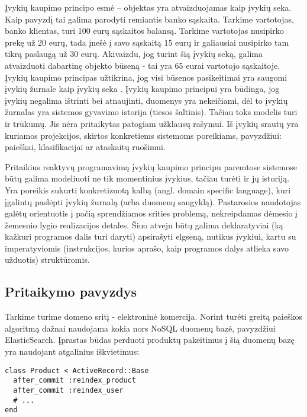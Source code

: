 Įvykių kaupimo principo esmė – objektas yra atvaizduojamas kaip įvykių seka. Kaip pavyzdį tai galima parodyti remiantis banko sąskaita. Tarkime vartotojas, banko klientas, turi 100 eurų sąskaitos balansą. Tarkime vartotojas nusipirko prekę už 20 eurų, tada įnešė į savo sąskaitą 15 eurų ir galiausiai nusipirko tam tikrą paslaugą už 30 eurų. Akivaizdu, jog turint šią įvykių seką, galima atvaizduoti dabartinę objekto būseną - tai yra 65 eurai vartotojo sąskaitoje. Įvykių kaupimo principas užtikrina, jog visi būsenos pasikeitimai yra saugomi įvykių žurnale kaip įvykių seka \cite{vernon2013implementing}. Įvykių kaupimo principui yra būdinga, jog įvykių negalima ištrinti bei atnaujinti, duomenys yra nekeičiami, dėl to įvykių žurnalas yra sistemos gyvavimo istorija (tiesos šaltinis). Tačiau toks modelis turi ir trūkumų. Jis nėra pritaikytas patogiam užklausų rašymui. Iš įvykių srautų yra kuriamos projekcijos, skirtos konkretiems sistemoms poreikiams, pavyzdžiui: paieškai, klasifikacijai ar ataskaitų ruošimui.

Pritaikius reaktyvų programavimą įvykių kaupimo principu paremtose sistemose būtų galima modeliuoti ne tik momentinius įvykius, tačiau turėti ir jų istoriją. Yra poreikis sukurti konkretizuotą kalbą (angl. domain specific language), kuri įgalintų paslėpti įvykių žurnalą (arba duomenų saugyklą). Pastarosios naudotojas galėtų orientuotis į pačią sprendžiamos srities problemą, nekreipdamas dėmesio į žemesnio lygio realizacijos detales. Šiuo atveju būtų galima deklaratyviai (ką kažkuri programos dalis turi daryti) apsirašyti elgseną, nutikus įvykiui, kartu su imperatyviomis (instrukcijos, kurios aprašo, kaip programos dalys atlieka savo užduotis) struktūromis.

\subsection{Pritaikymo pavyzdys}

Tarkime turime domeno sritį - elektroninė komercija. Norint turėti greitą paieškos algoritmą dažnai naudojama kokia nors NoSQL duomenų bazė, pavyzdžiui ElasticSearch. Įprastas būdas perduoti produktų pakeitimus į šią duomenų bazę yra naudojant atgalinius iškvietimus:

\begin{lstlisting}[]
class Product < ActiveRecord::Base
  after_commit :reindex_product
  after_commit :reindex_user
  # ...
end
\end{lstlisting}

